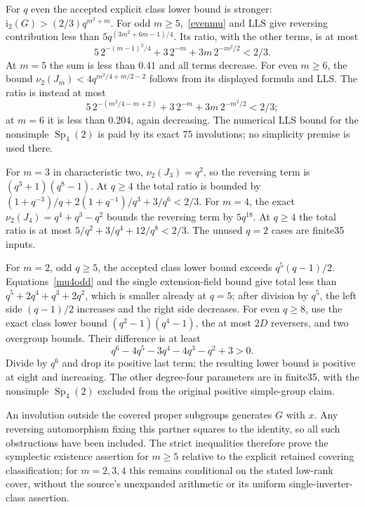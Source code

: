 \documentclass[10pt]{article}
\newcommand{\ii}{\mathrm i_2}\newcommand{\nuu}{\nu_2}\newcommand{\F}{\mathbb F}\newcommand{\GL}{\operatorname{GL}}\newcommand{\GU}{\operatorname{GU}}\newcommand{\Sp}{\operatorname{Sp}}\newcommand{\PSp}{\operatorname{PSp}}\newcommand{\PGSp}{\operatorname{PGSp}}\newcommand{\Aut}{\operatorname{Aut}}
\begin{document}
For $q$ even the accepted explicit class lower bound is stronger:
$\ii(G)>(2/3)q^{m^2+m}$. For odd $m\ge5$,~\eqref{evenmu} and LLS give
reversing contribution less than $5q^{(3m^2+6m-1)/4}$. Its ratio, with the
other terms, is at most
\[
 5\,2^{-(m-1)^2/4}+3\,2^{-m}+3m\,2^{-m^2/2}<2/3.
\]
At $m=5$ the sum is less than $0.41$ and all terms decrease. For even
$m\ge6$, the bound $\nuu(J_m)<4q^{m^2/4+m/2-2}$ follows from its displayed
formula and LLS. The ratio is instead at most
\[
 5\,2^{-(m^2/4-m+2)}+3\,2^{-m}+3m\,2^{-m^2/2}<2/3;
\]
at $m=6$ it is less than $0.204$, again decreasing. The numerical LLS
bound for the nonsimple $\Sp_4(2)$ is paid by its exact $75$ involutions;
no simplicity premise is used there.

For $m=3$ in characteristic two, $\nuu(J_3)=q^2$, so the reversing term
is $(q^3+1)(q^8-1)$. At $q\ge4$ the total ratio is bounded by
$(1+q^{-3})/q+2(1+q^{-1})/q^3+3/q^6<2/3$.
For $m=4$, the exact $\nuu(J_4)=q^4+q^3-q^2$ bounds the reversing term
by $5q^{18}$. At $q\ge4$ the total ratio is at most
$5/q^2+3/q^4+12/q^8<2/3$. The unused $q=2$ cases are finite35 inputs.

For $m=2$, odd $q\ge5$, the accepted class lower bound exceeds
$q^5(q-1)/2$. Equations~\eqref{mu4odd} and the single extension-field
bound give total less than
$q^5+2q^4+q^3+2q^2$, which is smaller already at $q=5$; after division by
$q^5$, the left side $(q-1)/2$ increases and the right side decreases.
For even $q\ge8$, use the exact class lower bound
$(q^2-1)(q^4-1)$, the at most $2D$ reversers, and two overgroup bounds.
Their difference is at least
\[
 q^6-4q^5-3q^4-4q^3-q^2+3>0.
\]
Divide by $q^6$ and drop its positive last term; the resulting lower bound
is positive at eight and increasing. The other degree-four parameters are
in finite35, with the nonsimple $\Sp_4(2)$ excluded from the original
positive simple-group claim.

An involution outside the covered proper subgroups generates $G$ with $x$.
Any reversing automorphism fixing this partner squares to the identity,
so all such obstructions have been included. The strict inequalities
therefore prove the symplectic existence assertion for $m\ge5$ relative to
the explicit retained covering classification; for $m=2,3,4$ this remains
conditional on the stated low-rank cover, without the source's unexpanded arithmetic
or its uniform single-inverter-class assertion.
\end{document}
